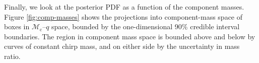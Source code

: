 Finally, we look at the posterior PDF as a function of the component masses.  Figure \ref{fig:comp-masses} shows the projections into component-mass space of boxes in $\mathcal{M}_\mathrm{c}$--$q$ space, bounded by the one-dimensional 90\% credible interval boundaries.  The region in component mass space is bounded above and below by curves of constant chirp mass, and on either side by the uncertainty in mass ratio.